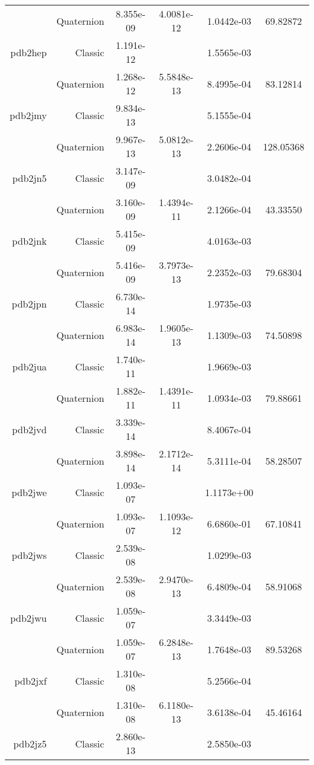 \begin{xltabular}{\textwidth}{r|rS[table-format=1.3e+2]S[table-format=1.4e+2]S[table-format=1.4e+2]S[table-format=-1.5]}
& Quaternion & 8.355e-09 & 4.0081e-12 & 1.0442e-03 & 69.82872\\  \addlinespace
pdb2hep & Classic & 1.191e-12 &  & 1.5565e-03 & \\
& Quaternion & 1.268e-12 & 5.5848e-13 & 8.4995e-04 & 83.12814\\  \addlinespace
pdb2jmy & Classic & 9.834e-13 &  & 5.1555e-04 & \\
& Quaternion & 9.967e-13 & 5.0812e-13 & 2.2606e-04 & 128.05368\\  \addlinespace
pdb2jn5 & Classic & 3.147e-09 &  & 3.0482e-04 & \\
& Quaternion & 3.160e-09 & 1.4394e-11 & 2.1266e-04 & 43.33550\\  \addlinespace
pdb2jnk & Classic & 5.415e-09 &  & 4.0163e-03 & \\
& Quaternion & 5.416e-09 & 3.7973e-13 & 2.2352e-03 & 79.68304\\  \addlinespace
pdb2jpn & Classic & 6.730e-14 &  & 1.9735e-03 & \\
& Quaternion & 6.983e-14 & 1.9605e-13 & 1.1309e-03 & 74.50898\\  \addlinespace
pdb2jua & Classic & 1.740e-11 &  & 1.9669e-03 & \\
& Quaternion & 1.882e-11 & 1.4391e-11 & 1.0934e-03 & 79.88661\\  \addlinespace
pdb2jvd & Classic & 3.339e-14 &  & 8.4067e-04 & \\
& Quaternion & 3.898e-14 & 2.1712e-14 & 5.3111e-04 & 58.28507\\  \addlinespace
pdb2jwe & Classic & 1.093e-07 &  & 1.1173e+00 & \\
& Quaternion & 1.093e-07 & 1.1093e-12 & 6.6860e-01 & 67.10841\\  \addlinespace
pdb2jws & Classic & 2.539e-08 &  & 1.0299e-03 & \\
& Quaternion & 2.539e-08 & 2.9470e-13 & 6.4809e-04 & 58.91068\\  \addlinespace
pdb2jwu & Classic & 1.059e-07 &  & 3.3449e-03 & \\
& Quaternion & 1.059e-07 & 6.2848e-13 & 1.7648e-03 & 89.53268\\  \addlinespace
pdb2jxf & Classic & 1.310e-08 &  & 5.2566e-04 & \\
& Quaternion & 1.310e-08 & 6.1180e-13 & 3.6138e-04 & 45.46164\\  \addlinespace
pdb2jz5 & Classic & 2.860e-13 &  & 2.5850e-03 & \\

\end{xltabular}
